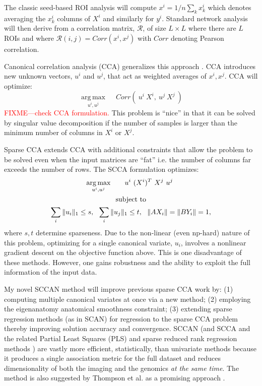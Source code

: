 \documentclass{llncs}
\begin{document}
The classic seed-based ROI analysis will compute $x^i = 1/n \sum_k x^i_k$ which denotes averaging the $x^i_k$ columns of $X^i$ and similarly for $y^i$.  Standard network analysis will then derive from a correlation matrix, $\mathcal{R}$, of size $L \times L$ where there are $L$ ROIs and where $\mathcal{R}(i,j)=Corr(x^i,x^j)$ with $Corr$ denoting Pearson correlation. 

Canonical correlation analysis (CCA) generalizes this approach \cite{Hotelling}.  CCA introduces new unknown vectors, $u^i$ and $u^j$, that act as weighted averages of $x^i, x^j$.  CCA will optimize:
\begin{equation}
\underset{u^i,u^j}{\operatorname{arg\,max}} \quad~ Corr(~u^i~X^i,~u^j~X^j~) 
\end{equation}
\textcolor{red}{FIXME---check CCA formulation.}
This problem is ``nice'' in that it can be solved by singular value decomposition if the number of samples is larger than the minimum number of columns in $X^i$ or $X^j$.

Sparse CCA extends CCA with additional constraints that allow the problem to be solved even when the input matrices are ``fat'' i.e. the number of columns far exceeds the number of rows.  The SCCA formulation optimizes: 
\begin{gather*}
\underset{u^i,u^j}{\operatorname{arg\,max}} \quad~ ~~u^i~(X^i)^T ~X^j~u^j~\\ \notag \text{subject to} \\ \notag
\sum_i \|u_i\|_1 \leq s,~~ \sum_i \|u_j\|_1 \leq t, ~~\| A X_i \| = \| B Y_i \| = 1,
\end{gather*}
where $s, t$ determine sparseness.  Due to the non-linear (even np-hard) nature of this problem, optimizing for a single canonical variate, $u_i$, involves a nonlinear gradient descent on the objective function above.  This is one disadvantage of these methods.  However, one gains robustness and the ability to exploit the full information of the input data.  

My novel SCCAN method will improve previous sparse CCA work by: (1) computing multiple canonical variates at once via a new method; (2) employing the eigenanatomy anatomical smoothness constraint; (3) extending sparse regression methods (as in SCAN) for regression to the sparse CCA problem thereby improving solution accuracy and convergence. %
SCCAN (and SCCA \cite{witten_extensions_2009} and the related Partial Least Squares (PLS) \cite{LeFloch2012} and sparse reduced rank regression methods \cite{Vounou2010}) are vastly more efficient, statistically, than univariate methods because it produces a single association metric for the full dataset and reduces dimensionality of both the imaging and the genomics {\em at the same time}.  %
The method is also suggested by Thompson et al. as a promising approach \cite{Glahn2007,Thompson2010}. 
\end{document}
